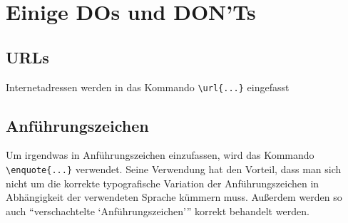 \section{Einige DOs und DON'Ts}%
\label{sec:DOsAndDONTs}


\subsection{URLs}
%
Internetadressen werden in das Kommando \verb#\url{...}# eingefasst

\subsection{Anführungszeichen}%
%
\label{sec:Anfuehrungszeichen}
Um irgendwas in Anführungszeichen einzufassen, wird das Kommando 
\verb#\enquote{...}# verwendet. Seine Verwendung hat den Vorteil,
dass man sich nicht um die korrekte typografische Variation der
Anführungszeichen in Abhängigkeit der verwendeten
Sprache kümmern muss.
Außerdem werden so auch \enquote{verschachtelte \enquote{Anführungszeichen}}
korrekt behandelt werden.